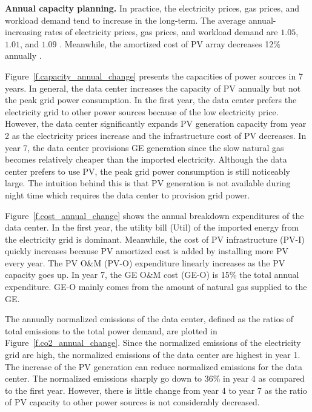 \textbf{Annual capacity planning.} In practice, the electricity prices, gas prices, and workload demand tend to increase in the long-term. The average annual-increasing rates of electricity prices, gas prices, and workload demand are $1.05$, $1.01$, and $1.09$ \cite{eiaElectricityPrices,gasPrice,StevenGlobalTraffic}. Meanwhile, the amortized cost of PV array decreases 12\% annually \cite{solarCost}.

Figure~\ref{f.capacity_annual_change} presents the capacities of power sources in 7 years. In general, the data center increases the capacity of PV annually but not the peak grid power consumption. In the first year, the data center prefers the electricity grid to other power sources because of the low electricity price. However, the data center significantly expands PV generation capacity from year 2 as the electricity prices increase and the infrastructure cost of PV decreases. In year 7, the data center provisions GE generation since the slow natural gas becomes relatively cheaper than the imported electricity. Although the data center prefers to use PV, the peak grid power consumption is still noticeably large. The intuition behind this is that PV generation is not available during night time which requires the data center to provision grid power.

Figure~\ref{f.cost_annual_change} shows the annual breakdown expenditures of the data center. In the first year, the utility bill (Util) of the imported energy from the electricity grid is dominant. Meanwhile, the cost of PV infrastructure (PV-I) quickly increases because PV amortized cost is added by installing more PV every year. The PV O\&M (PV-O) expenditure linearly increases as the PV capacity goes up. In year 7, the GE O\&M cost (GE-O) is 15\% the total annual expenditure. GE-O mainly comes from the amount of natural gas supplied to the GE.

The annually normalized emissions of the data center, defined as the ratios of total emissions to the total power demand, are plotted in Figure~\ref{f.co2_annual_change}. Since the normalized emissions of the electricity grid are high, the normalized emissions of the data center are highest in year 1.
The increase of the PV generation can reduce normalized emissions for the data center. The normalized emissions sharply go down to 36\% in year 4 as compared to the first year. However, there is little change from year 4 to year 7 as the ratio of PV capacity to other power sources is not considerably decreased.


